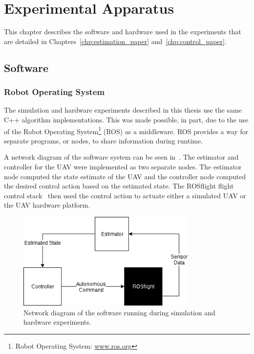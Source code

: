 
\chapter{Experimental Apparatus}
\label{chp:experimental_apparatus}

This chapter describes the software and hardware used in the experiments that
are detailed in Chapters~\ref{chp:estimation_paper} and~\ref{chp:control_paper}.

\section{Software}
\subsection {Robot Operating System}
The simulation and hardware experiments described in this thesis use the same
C++ algorithm implementations.
This was made possible, in part, due to the use of the Robot Operating System\footnote{Robot Operating System:
\href{www.ros.org}{www.ros.org}} (ROS) as a middleware. ROS provides a way for separate
programs, or nodes, to share information during runtime.

A network diagram of the software system can be seen in~. The estimator and
controller for the UAV were implemented as two separate nodes. 
The estimator node computed the state estimate of the UAV and the controller
node computed the desired control action based on the estimated state.
The ROSflight flight control stack~\cite{jackson2016rosflight}
then used the control action to actuate
either a simulated UAV or the UAV hardware platform.

\begin{figure}[htbp]
  \centering
  \includegraphics[width=3.5in]{figures/roscopter.png}
  \caption[Software Architecture Network Diagram]{Network diagram of the
  software running during simulation and hardware experiments.}
%
  \label{fig:network_diagram}
\end{figure}


